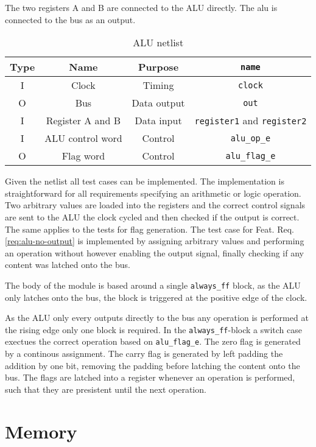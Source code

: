 The two registers A and B are connected to the ALU directly. The alu is connected to the bus as an output. 

\begin{table}[H]
\begin{tabular}{cccc}
  Type& Name & Purpose & \texttt{name}\\ \hline
  I   & Clock & Timing & \texttt{clock}\\
  O   & Bus     & Data output & \texttt{out}        \\
  I   & Register A and B & Data input & \texttt{register1} and \texttt{register2} \\
  I   & ALU control word & Control & \texttt{alu\_op\_e}\\
O   & Flag word & Control & \texttt{alu\_flag\_e}
\end{tabular}
\caption{ALU netlist}
\label{tab:alu-i/o}
\end{table}

Given the netlist all test cases can be implemented. The implementation is straightforward for all requirements specifying an arithmetic or logic operation. Two arbitrary values are loaded into the registers and the correct control signals are sent to the ALU the clock cycled and then checked if the output is correct. The same applies to the tests for flag generation. The test case for Feat. Req. \ref{req:alu-no-output} is implemented by assigning arbitrary values and performing an operation without however enabling the output signal, finally checking if any content was latched onto the bus.  

The body of the module is based around a single \texttt{always\_ff} block, as the ALU only latches onto the bus, the block is triggered at the positive edge of the clock. 

As the ALU only every outputs directly to the bus any operation is performed at the rising edge only one block is required. In the \texttt{always\_ff}-block a switch case exectues the correct operation based on \texttt{alu\_flag\_e}. The zero flag is generated by a continous assignment. The carry flag is generated by left padding the addition by one bit, removing the padding before latching the content onto the bus. The flags are latched into a register whenever an operation is performed, such that they are presistent until the next operation.


% 

\section{Memory}

